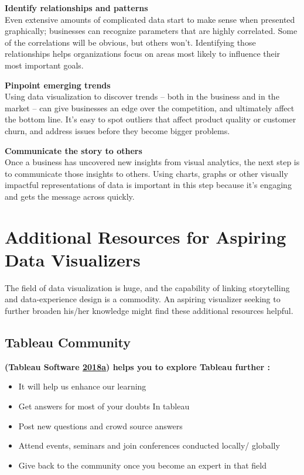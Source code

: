\documentclass[]{book}
\providecommand{\tightlist}{%
  \setlength{\itemsep}{0pt}\setlength{\parskip}{0pt}}
\theoremstyle{definition}
\theoremstyle{definition}
\theoremstyle{definition}
\theoremstyle{remark}
\begin{document}
\textbf{Identify relationships and patterns}\\
Even extensive amounts of complicated data start to make sense when
presented graphically; businesses can recognize parameters that are
highly correlated. Some of the correlations will be obvious, but others
won't. Identifying those relationships helps organizations focus on
areas most likely to influence their most important goals.

\textbf{Pinpoint emerging trends}\\
Using data visualization to discover trends -- both in the business and
in the market -- can give businesses an edge over the competition, and
ultimately affect the bottom line. It's easy to spot outliers that
affect product quality or customer churn, and address issues before they
become bigger problems.

\textbf{Communicate the story to others}\\
Once a business has uncovered new insights from visual analytics, the
next step is to communicate those insights to others. Using charts,
graphs or other visually impactful representations of data is important
in this step because it's engaging and gets the message across quickly.

\section{Additional Resources for Aspiring Data
Visualizers}\label{additional-resources-for-aspiring-data-visualizers}

The field of data visualization is huge, and the capability of linking
storytelling and data-experience design is a commodity. An aspiring
visualizer seeking to further broaden his/her knowledge might find these
additional resources helpful.

\subsection{Tableau Community}\label{tableau-community-1}

\textbf{(Tableau Software
\protect\hyperlink{ref-Tableau_Community}{2018}\protect\hyperlink{ref-Tableau_Community}{a})
helps you to explore Tableau further :}

\begin{itemize}
\tightlist
\item
  It will help us enhance our learning
\item
  Get answers for most of your doubts In tableau
\item
  Post new questions and crowd source answers
\item
  Attend events, seminars and join conferences conducted locally/
  globally
\item
  Give back to the community once you become an expert in that field
\end{itemize}
\end{document}
